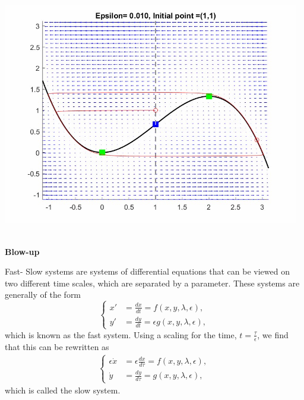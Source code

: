 \documentclass[15pt, a0paper, portrait]{tikzposter}
\begin{document}
\begin{columns}
{}

{
	\begin{tikzfigure}[h!]
		\centering
		\includegraphics[height=10cm,width=13cm]{Posterpic2.jpg}
\end{tikzfigure}}

\end{columns}
\block{~}
{\textbf{Blow-up}\centering
	
	Fast- Slow systems are systems of differential equations that can be viewed on two different time scales, which are separated by a parameter.
	These systems are generally of the form
	\begin{equation*} 
	\begin{cases}
	x' &=\frac{dx}{dt}= f(x,y,\lambda, \epsilon),\\
	y' &= \frac{dy}{dt}= \epsilon g( x,y, \lambda, \epsilon),
	\end{cases}\label{FastS}
	\end{equation*}
	which is known as the fast system.
	Using a scaling for the time, $t = \frac{\tau}{\epsilon} $, we find that this can be rewritten as
	\begin{align*}
	\begin{cases}
	\epsilon \dot{x} &= \epsilon \frac{dx}{d \tau} = f(x,y,\lambda, \epsilon),\\
	\dot{y} & = \frac{dy}{d \tau} =  g( x,y, \lambda, \epsilon),
	\end{cases}\label{SlowS}
	\end{align*}
	which is called the slow system.
}
\end{document}
